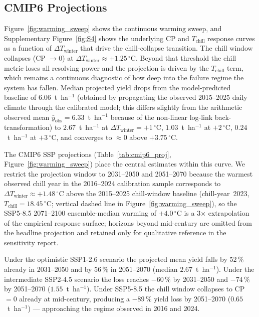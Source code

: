 \documentclass[agronomy,article,submit,pdftex,moreauthors]{Definitions/mdpi}
\begin{document}
\subsection{CMIP6 Projections}
\label{sec:results_cmip6}

Figure~\ref{fig:warming_sweep} shows the continuous warming sweep, and Supplementary Figure~\ref{fig:S4} shows the underlying CP and $T_{\text{chill}}$ response curves as a function of $\Delta T_{\text{winter}}$ that drive the chill-collapse transition. The chill window collapses (CP $\to 0$) at $\Delta T_{\text{winter}}\approx +1.25\,^\circ$C. Beyond that threshold the chill metric loses all resolving power and the projection is driven by the $T_{\text{chill}}$ term, which remains a continuous diagnostic of how deep into the failure regime the system has fallen. Median projected yield drops from the model-predicted baseline of $6.06$~t~ha$^{-1}$ (obtained by propagating the observed 2015--2025 daily climate through the calibrated model; this differs slightly from the arithmetic observed mean $\bar{y}_{\text{obs}}=6.33$~t~ha$^{-1}$ because of the non-linear log-link back-transformation) to $2.67$~t~ha$^{-1}$ at $\Delta T_{\text{winter}}=+1\,^\circ$C, $1.03$~t~ha$^{-1}$ at $+2\,^\circ$C, $0.24$~t~ha$^{-1}$ at $+3\,^\circ$C, and converges to $\approx 0$ above $+3.75\,^\circ$C.

The CMIP6 SSP projections (Table~\ref{tab:cmip6_proj}, Figure~\ref{fig:warming_sweep}) place the central estimates within this curve. We restrict the projection window to 2031--2050 and 2051--2070 because the warmest observed chill year in the 2016--2024 calibration sample corresponds to $\Delta T_{\text{winter}}\approx +1.48\,^\circ$C above the 2015--2025 chill-window baseline (chill-year~2023, $T_{\text{chill}}=18.45\,^\circ$C; vertical dashed line in Figure~\ref{fig:warming_sweep}), so the SSP5-8.5 2071--2100 ensemble-median warming of $+4.0\,^\circ$C is a 3$\times$ extrapolation of the empirical response surface; horizons beyond mid-century are omitted from the headline projection and retained only for qualitative reference in the sensitivity report.

Under the optimistic SSP1-2.6 scenario the projected mean yield falls by $52\,\%$ already in 2031--2050 and by $56\,\%$ in 2051--2070 (median $2.67$~t~ha$^{-1}$). Under the intermediate SSP2-4.5 scenario the loss reaches $-60\,\%$ by 2031--2050 and $-74\,\%$ by 2051--2070 ($1.55$~t~ha$^{-1}$). Under SSP5-8.5 the chill window collapses to CP$=0$ already at mid-century, producing a $-89\,\%$ yield loss by 2051--2070 ($0.65$~t~ha$^{-1}$) --- approaching the regime observed in 2016 and 2024.
\end{document}
